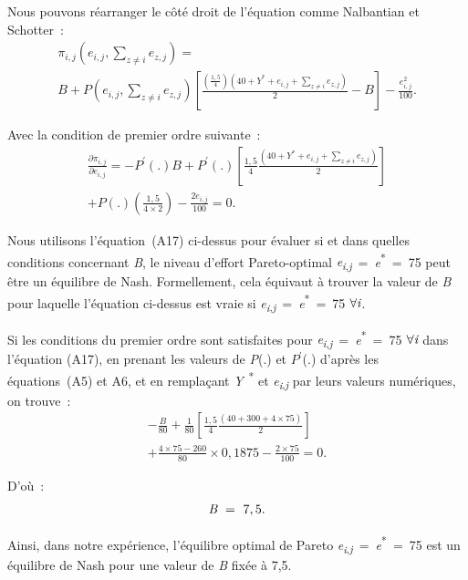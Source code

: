 \begin{Article}
\begin{refsection}[Lebourges]
\begin{appendices}
Nous pouvons réarranger le côté droit de l'équation comme Nalbantian et
Schotter~:
\begin{multline}
\pi_{i,j}\left( e_{i,j},\sum_{z \neq i}^{}e_{z,j} \right) = \\
B + P\left( e_{i,j},\sum_{z \neq i}^{}e_{z,j} \right)\left\lbrack \frac{\left( \frac{1,5}{4} \right)\left( 40 + Y^{*} + e_{i,j} + \sum_{z \neq i}^{}e_{z,j} \right)}{2} - B \right\rbrack - \frac{e_{i,j}^{2}}{100}.
\end{multline}

Avec la condition de premier ordre suivante~:
\begin{multline}
   \frac{\partial\pi_{i,j}}{\partial e_{i,j}} = - P^{'}(.)B + P^{'}(.)\left\lbrack \frac{1,5}{4}\frac{\left( 40 + Y^{*} + e_{i,j} + \sum_{z \neq i}^{}e_{z,j} \right)}{2} \right\rbrack \\
   + P(.)\left( \frac{1,5}{4 \times 2} \right) - \frac{2e_{i,j}}{100} = 0.
\end{multline}

Nous utilisons l'équation~(A17) ci-dessus pour évaluer si et dans
quelles conditions concernant \emph{B}, le niveau d'effort
Pareto-optimal
\emph{e\textsubscript{i}}\textsubscript{,\emph{j}}~=~\emph{e}\textsuperscript{*}~=~75
peut être un équilibre de Nash. Formellement, cela équivaut à trouver la
valeur de \emph{B} pour laquelle l'équation ci-dessus est vraie si
\emph{e\textsubscript{i}}\textsubscript{,\emph{j}}~=~\emph{e}\textsuperscript{*}~=~75
$\forall\emph{i}$.

Si les conditions du premier ordre sont satisfaites pour
\emph{e\textsubscript{i}}\textsubscript{,\emph{j}}~=~\emph{e}\textsuperscript{*}~=~75
$\forall\emph{i}$ dans l'équation (A17), en prenant les valeurs de \emph{P}(.)
et $P^{'}$(.) d'après les équations~(A5) et A6, et en remplaçant
\emph{Y}\textsuperscript{~*} et
\emph{e\textsubscript{i}}\textsubscript{,\emph{j}} par leurs valeurs
numériques, on trouve~:
\begin{multline}
- \frac{B}{80} + \frac{1}{80}\left\lbrack \frac{1,5}{4}\frac{(40 + 300 + 4 \times 75)}{2} \right\rbrack \\
+ \frac{4 \times 75 - 260}{80} \times 0,1875 - \frac{2 \times 75}{100} = 0.
\end{multline}

D'où~:
\begin{equation}
    \emph{B}~=~7,5.
\end{equation}

Ainsi, dans notre expérience, l'équilibre optimal de Pareto
\emph{e\textsubscript{i}}\textsubscript{,\emph{j}}~=~\emph{e}\textsuperscript{*}~=~75
est un équilibre de Nash pour une valeur de \emph{B} fixée à 7,5.


\end{appendices}
\end{refsection}
\end{Article}
